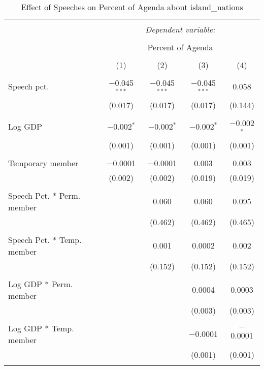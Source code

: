 
\begin{table}[!htbp] \centering 
  \caption{Effect of Speeches on Percent of Agenda about  island_nations} 
  \label{} 
\begin{tabular}{@{\extracolsep{5pt}}lcccc} 
\\[-1.8ex]\hline 
\hline \\[-1.8ex] 
 & \multicolumn{4}{c}{\textit{Dependent variable:}} \\ 
\cline{2-5} 
\\[-1.8ex] & \multicolumn{4}{c}{Percent of Agenda} \\ 
\\[-1.8ex] & (1) & (2) & (3) & (4)\\ 
\hline \\[-1.8ex] 
 Speech pct. & $-$0.045$^{***}$ & $-$0.045$^{***}$ & $-$0.045$^{***}$ & 0.058 \\ 
  & (0.017) & (0.017) & (0.017) & (0.144) \\ 
  & & & & \\ 
 Log GDP & $-$0.002$^{*}$ & $-$0.002$^{*}$ & $-$0.002$^{*}$ & $-$0.002$^{*}$ \\ 
  & (0.001) & (0.001) & (0.001) & (0.001) \\ 
  & & & & \\ 
 Temporary member & $-$0.0001 & $-$0.0001 & 0.003 & 0.003 \\ 
  & (0.002) & (0.002) & (0.019) & (0.019) \\ 
  & & & & \\ 
 Speech Pct. * Perm. member &  & 0.060 & 0.060 & 0.095 \\ 
  &  & (0.462) & (0.462) & (0.465) \\ 
  & & & & \\ 
 Speech Pct. * Temp. member &  & 0.001 & 0.0002 & 0.002 \\ 
  &  & (0.152) & (0.152) & (0.152) \\ 
  & & & & \\ 
 Log GDP * Perm. member &  &  & 0.0004 & 0.0003 \\ 
  &  &  & (0.003) & (0.003) \\ 
  & & & & \\ 
 Log GDP * Temp. member &  &  & $-$0.0001 & $-$0.0001 \\ 
  &  &  & (0.001) & (0.001) \\ 
  & & & & \\ 

\end{tabular}
\end{table}
